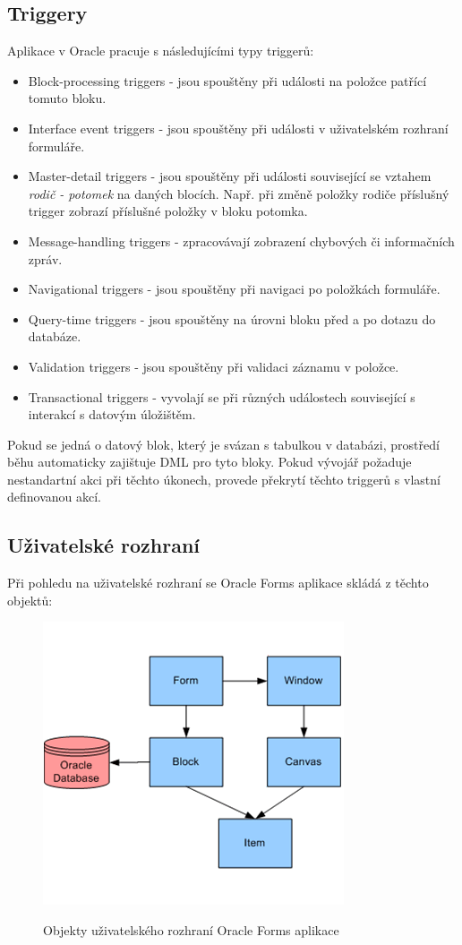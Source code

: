 \documentclass{diplomka}
\begin{document}
\subsection*{Triggery}
Aplikace v Oracle pracuje s následujícími typy triggerů:
\begin{itemize}
\item Block-processing triggers - jsou spouštěny při události na položce patřící tomuto bloku.
\item Interface event triggers - jsou spouštěny při události v uživatelském rozhraní formuláře.
\item Master-detail triggers - jsou spouštěny při události související se vztahem \emph{rodič - potomek} na daných blocích. Např. při změně položky rodiče příslušný trigger zobrazí příslušné položky v bloku potomka.
\item Message-handling triggers - zpracovávají zobrazení chybových či informačních zpráv.
\item Navigational triggers - jsou spouštěny při navigaci po položkách formuláře.
\item Query-time triggers - jsou spouštěny na úrovni bloku před a po dotazu do databáze.
\item Validation triggers - jsou spouštěny při validaci záznamu v položce.
\item Transactional triggers - vyvolají se při různých událostech související s interakcí s datovým úložištěm.
\end{itemize}
Pokud se jedná o datový blok, který je svázan s tabulkou v databázi, prostředí běhu automaticky zajištuje DML pro tyto bloky.
Pokud vývojář požaduje nestandartní akci při těchto úkonech, provede překrytí těchto triggerů s vlastní definovanou akcí.
\newpage
\subsection{Uživatelské rozhraní}
Při pohledu na uživatelské rozhraní se Oracle Forms aplikace skládá z těchto objektů:
\begin{figure}[H]
  \centering
  \includegraphics[scale=0.8]{obr/window.png}
\label{obr:gui}
\caption{Objekty uživatelského rozhraní Oracle Forms aplikace}
\end{figure}
\end{document}
